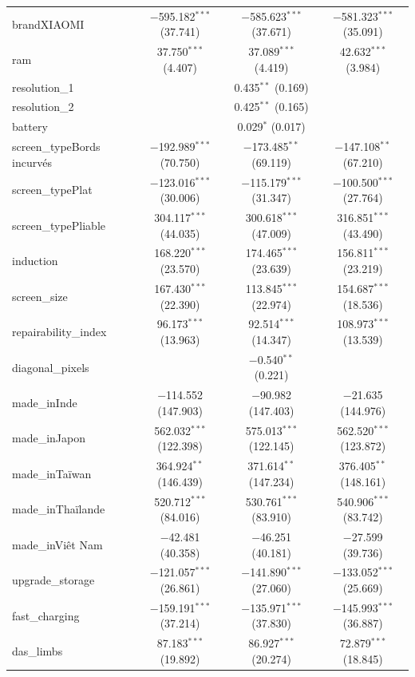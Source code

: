\documentclass[
  12pt,
]{report}
\begin{document}
\begin{table}[!htbp]
\begin{tabular}{@{\extracolsep{5pt}}lccc}
  brandXIAOMI & $-$595.182$^{***}$ (37.741) & $-$585.623$^{***}$ (37.671) & $-$581.323$^{***}$ (35.091) \\ 
  ram & 37.750$^{***}$ (4.407) & 37.089$^{***}$ (4.419) & 42.632$^{***}$ (3.984) \\ 
  resolution\_1 &  & 0.435$^{**}$ (0.169) &  \\ 
  resolution\_2 &  & 0.425$^{**}$ (0.165) &  \\ 
  battery &  & 0.029$^{*}$ (0.017) &  \\ 
  screen\_typeBords incurvés & $-$192.989$^{***}$ (70.750) & $-$173.485$^{**}$ (69.119) & $-$147.108$^{**}$ (67.210) \\ 
  screen\_typePlat & $-$123.016$^{***}$ (30.006) & $-$115.179$^{***}$ (31.347) & $-$100.500$^{***}$ (27.764) \\ 
  screen\_typePliable & 304.117$^{***}$ (44.035) & 300.618$^{***}$ (47.009) & 316.851$^{***}$ (43.490) \\ 
  induction & 168.220$^{***}$ (23.570) & 174.465$^{***}$ (23.639) & 156.811$^{***}$ (23.219) \\ 
  screen\_size & 167.430$^{***}$ (22.390) & 113.845$^{***}$ (22.974) & 154.687$^{***}$ (18.536) \\ 
  repairability\_index & 96.173$^{***}$ (13.963) & 92.514$^{***}$ (14.347) & 108.973$^{***}$ (13.539) \\ 
  diagonal\_pixels &  & $-$0.540$^{**}$ (0.221) &  \\ 
  made\_inInde & $-$114.552 (147.903) & $-$90.982 (147.403) & $-$21.635 (144.976) \\ 
  made\_inJapon & 562.032$^{***}$ (122.398) & 575.013$^{***}$ (122.145) & 562.520$^{***}$ (123.872) \\ 
  made\_inTaïwan & 364.924$^{**}$ (146.439) & 371.614$^{**}$ (147.234) & 376.405$^{**}$ (148.161) \\ 
  made\_inThaïlande & 520.712$^{***}$ (84.016) & 530.761$^{***}$ (83.910) & 540.906$^{***}$ (83.742) \\ 
  made\_inViêt Nam & $-$42.481 (40.358) & $-$46.251 (40.181) & $-$27.599 (39.736) \\ 
  upgrade\_storage & $-$121.057$^{***}$ (26.861) & $-$141.890$^{***}$ (27.060) & $-$133.052$^{***}$ (25.669) \\ 
  fast\_charging & $-$159.191$^{***}$ (37.214) & $-$135.971$^{***}$ (37.830) & $-$145.993$^{***}$ (36.887) \\ 
  das\_limbs & 87.183$^{***}$ (19.892) & 86.927$^{***}$ (20.274) & 72.879$^{***}$ (18.845) \\ 

\end{tabular}
\end{table}
\end{document}
